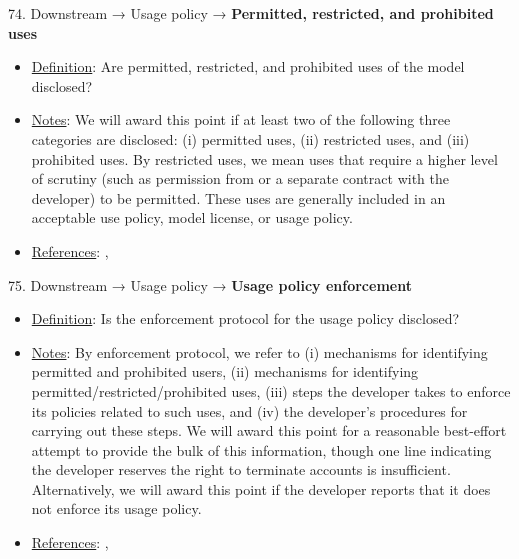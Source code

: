 74. Downstream → Usage policy → \textbf{Permitted, restricted, and prohibited uses}
\vspace{-\parskip}
\begin{itemize}
\item
\underline{Definition}: Are permitted, restricted, and prohibited uses of the model disclosed?
\item
\underline{Notes}: We will award this point if at least two of the following three categories are disclosed: (i) permitted uses, (ii) restricted uses, and (iii) prohibited uses. By restricted uses, we mean uses that require a higher level of scrutiny (such as permission from or a separate contract with the developer) to be permitted. These uses are generally included in an acceptable use policy, model license, or usage policy.
\item
\underline{References}: \citet{cohere2022}, \citet{meta2023}
\end{itemize} \vspace{\baselineskip}


75. Downstream → Usage policy → \textbf{Usage policy enforcement}
\vspace{-\parskip}
\begin{itemize}
\item
\underline{Definition}: Is the enforcement protocol for the usage policy disclosed?
\item
\underline{Notes}: By enforcement protocol, we refer to (i) mechanisms for identifying permitted and prohibited users, (ii) mechanisms for identifying permitted/restricted/prohibited uses, (iii) steps the developer takes to enforce its policies related to such uses, and (iv) the developer’s procedures for carrying out these steps. We will award this point for a reasonable best-effort attempt to provide the bulk of this information, though one line indicating the developer reserves the right to terminate accounts is insufficient. Alternatively, we will award this point if the developer reports that it does not enforce its usage policy.
\item
\underline{References}: \citet{cohere2022}, \citet{meta2023}
\end{itemize} \vspace{\baselineskip}


